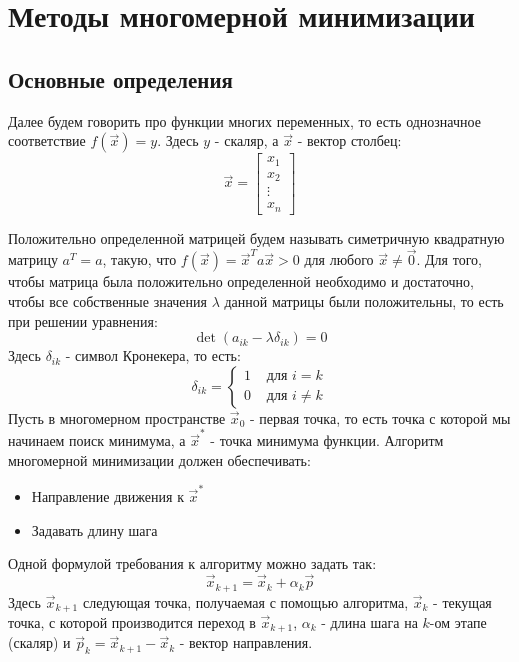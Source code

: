 \chapter{Методы многомерной минимизации}
\section{Основные определения}
Далее будем говорить про функции многих переменных, то есть однозначное соответствие $f(\vec x) = y$. Здесь $y$ - скаляр, а $\vec x$ - вектор столбец:
\begin{equation}
    \vec x = \left[
    \begin{array}{c}
         x_1  \\
         x_2  \\
         \vdots \\
         x_n
    \end{array}
    \right]
\end{equation}

Положительно определенной матрицей будем называть симетричную квадратную матрицу $a^T=a$, такую, что $f(\vec x) = {\vec x}^Ta{\vec x} > 0$ для любого $\vec x \neq \vec 0$. Для того, чтобы матрица была положительно определенной необходимо и достаточно, чтобы все собственные значения $\lambda$ данной матрицы были положительны, то есть при решении уравнения:
\begin{equation}
    \det \left( a_{ik} - \lambda\delta_{ik} \right)=0
\end{equation}
Здесь $\delta_{ik}$ - символ Кронекера, то есть:
\begin{equation*}
\delta_{ik} =
\left\{
\begin{array}{lr}
1 & \text{ для } i = k\\
0 & \text{ для } i \neq k
\end{array}
\right.
\end{equation*}
Пусть в многомерном пространстве $\vec x_0$ - первая точка, то есть точка с которой мы начинаем поиск минимума, а $\vec x^*$ - точка минимума функции. Алгоритм многомерной минимизации должен обеспечивать:
\begin{itemize}
    \item Направление движения к $\vec x^*$
    \item Задавать длину шага
\end{itemize}
Одной формулой требования к алгоритму можно задать так:
\begin{equation}
    \vec x_{k+1} =\vec x_k + \alpha_k \vec p
    \label{xk}
\end{equation}
Здесь $ \vec x_{k+1}$ следующая точка, получаемая с помощью алгоритма, $ \vec x_{k}$ - текущая точка, с которой производится переход в $ \vec x_{k+1}$, $\alpha_k$ - длина шага на $k$-ом этапе (скаляр) и $\vec p_k = \vec x_{k+1} - \vec x_{k} $ - вектор направления.

